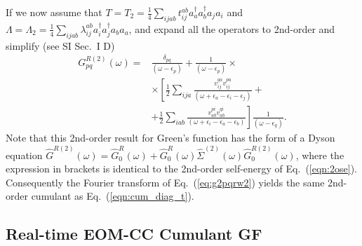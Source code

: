 \documentclass[aps,prb,twocolumn,groupaddress,floatfix]{revtex4}
\begin{document}
If we now assume that $T=T_2=\frac{1}{4}\sum_{ijab}t_{ij}^{ab} a^{\dagger}_a a^{\dagger}_b a_j a_i$ and $\Lambda=\Lambda_2=\frac{1}{4}\sum_{ijab}\lambda_{ij}^{ab} a^{\dagger}_i a^{\dagger}_j a_b a_a$,
and expand all the operators to 2nd-order and simplify (see SI Sec.\ I D)
\begin{equation}
\label{eq:g2pqrw2}
\begin{split}
G^{R(2)}_{pq} (\omega) =& \frac{\delta_{pq}}{(\omega-\epsilon_p)} +
\frac{1}{(\omega-\epsilon_p)} \times \\
&\times\left[ \frac{1}{2}\sum_{ija} \frac{v^{qa}_{ij}v^{pa}_{ij}}
{(\omega+\epsilon_a-\epsilon_i-\epsilon_j)}+ \right.\\
&+\left.
\frac{1}{2}\sum_{iab} \frac{v^{pi}_{ab}v^{qi}_{ab}}
{(\omega+\epsilon_i-\epsilon_a-\epsilon_b)}
\right]\frac{1}{(\omega-\epsilon_q)}.
\end{split}
\end{equation}
Note that this 2nd-order result for Green's function has the
form of a Dyson equation
$\hat{G}^{R(2)}(\omega) = \hat{G}^{R}_0(\omega) + \hat{G}^{R}_0(\omega)
\hat{\Sigma}^{(2)}(\omega)\hat{G}^{R(2)}_0(\omega)$, where the expression
in brackets is identical to the 2nd-order self-energy
of Eq.\ (\ref{eqn:2ose}).
Consequently  the Fourier transform of Eq.\ (\ref{eq:g2pqrw2}) yields
the same 2nd-order cumulant as Eq.\ (\ref{eqn:cum_diag_t}).

\subsection{Real-time EOM-CC Cumulant GF}
\label{sec:rt_core_gf}
\end{document}
